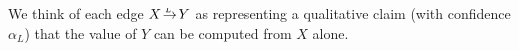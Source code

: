 \documentclass[letterpaper]{article} %
\theoremstyle{plain}
\theoremstyle{definition}
\theoremstyle{remark}
\newcommand{\dg}[1]{\mathbdcal{#1}}
\newcommand{\ed}[3]{#2\!%
  \overset{\smash{\mskip-5mu\raisebox{-1pt}{$\scriptscriptstyle
        #1$}}}{\rightarrow}\! #3}
\begin{document}
We think of each edge $\ed LXY$ as representing a
qualitative claim
(with confidence $\alpha_L$)
that the value of $Y$ can be computed from
$X$ alone.  
%
\end{document}
